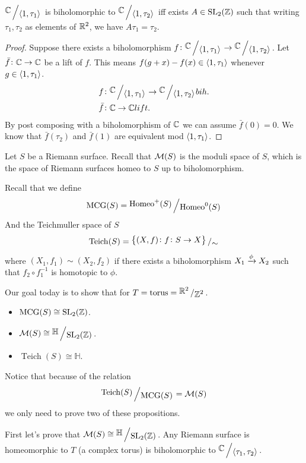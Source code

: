 \documentclass[11pt,a4paper]{article}
\renewcommand{\H}{\mathbb H}
\DeclareMathOperator{\Homeo}{Homeo}
\DeclareMathOperator{\MCG}{MCG}
\DeclareMathOperator{\Teich}{Teich}
\begin{document}
\begin{theorem}
  $\bigslant{\C}{\ip{1}{\tau_1}}$ is biholomorphic to 
  $\bigslant{\C}{\ip{1}{\tau_2}}$ iff exists $A \in \operatorname{SL}_2(\mathbb{Z})$
  such that writing $\tau_1, \tau_2$ as elements of $\mathbb{R}^2$, we have
  $A\tau_1 = \tau_2$.
\end{theorem}
\begin{proof}
  Suppose there exists a biholomorphism 
  $f \colon \bigslant{\C}{\ip{1}{\tau_1}} \to \bigslant{\C}{\ip{1}{\tau_2}}$.
  Let $\bar f \colon \mathbb{C} \to \mathbb{C}$ be a lift of $f$.
  This means $f(g + x) - f(x) \in \langle 1, \tau_1 \rangle$ whenever
  $g \in \langle 1, \tau_1 \rangle$.
  \begin{align*}
    &f \colon \bigslant{\C}{\ip{1}{\tau_1}} \to \bigslant{\C}{\ip{1}{\tau_2}}
    bih. \\
    &\bar f \colon \C \to \C lift.
  \end{align*}
  By post composing with a biholomorphism of $\mathbb{C}$ we can assume $\bar f(0) = 0$.
  We know that $\bar f(\tau_2)$ and $\bar f(1)$ are equivalent mod
  $\langle 1, \tau_1 \rangle$.
\end{proof}


\begin{remark}
  Let $S$ be a Riemann surface.
  Recall that $\mathcal{M}(S)$ is the moduli space of $S$, which is the space of Riemann
  surfaces homeo to $S$ up to biholomorphism.
\end{remark}
Recall that we define
\[
  \MCG(S) = \bigslant{\Homeo^+(S)}{\Homeo^0(S)}
\]
And the Teichmuller space of $S$
\[
  \mathrm{Teich}(S) = 
  \bigslant{\set{(X,f) \colon f \colon S \to X}}{\sim}
\]
where $(X_1,f_1) \sim (X_2,f_2)$ if there exists a biholomorphism 
$X_1 \xrightarrow{\phi} X_2$ such that $f_2 \circ f_1^{-1}$ is homotopic to $\phi$.

Our goal today is to show that for $T = \text{torus} = \bigslant{\R^2}{\Z^2}$.
\begin{itemize}
  \item $\MCG(S) \cong \SL_2(\Z)$.
  \item $\M(S) \cong \bigslant{\H}{\SL_2(\Z)}$.
  \item $\Teich(S) \cong \H$.
\end{itemize}

Notice that because of the relation
\[
  \bigslant{\Teich(S)}{\MCG(S)} = \M(S)
\]
we only need to prove two of these propositions.

First let's prove that $\M(S) \cong \bigslant{\H}{\SL_2(\Z)}$.
Any Riemann surface is homeomorphic to $T$ (a complex torus) is biholomorphic
to $\bigslant{\C}{\ip{\tau_1}{\tau_2}}$.
\end{document}
